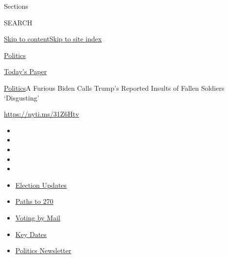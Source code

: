 Sections

SEARCH

\protect\hyperlink{site-content}{Skip to
content}\protect\hyperlink{site-index}{Skip to site index}

\href{https://www.nytimes3xbfgragh.onion/section/politics}{Politics}

\href{https://myaccount.nytimes3xbfgragh.onion/auth/login?response_type=cookie\&client_id=vi}{}

\href{https://www.nytimes3xbfgragh.onion/section/todayspaper}{Today's
Paper}

\href{/section/politics}{Politics}\textbar{}A Furious Biden Calls
Trump's Reported Insults of Fallen Soldiers `Disgusting'

\url{https://nyti.ms/31Z6Htv}

\begin{itemize}
\item
\item
\item
\item
\item
\end{itemize}

\begin{itemize}
\item
  \href{https://www.nytimes3xbfgragh.onion/live/2020/09/07/us/trump-vs-biden?action=click\&pgtype=Article\&state=default\&region=TOP_BANNER\&context=storylines_menu}{Election
  Updates}
\item
  \href{https://www.nytimes3xbfgragh.onion/interactive/2020/us/elections/election-states-biden-trump.html?action=click\&pgtype=Article\&state=default\&region=TOP_BANNER\&context=storylines_menu}{Paths
  to 270}
\item
  \href{https://www.nytimes3xbfgragh.onion/interactive/2020/08/31/us/politics/vote-by-mail-deadlines.html?action=click\&pgtype=Article\&state=default\&region=TOP_BANNER\&context=storylines_menu}{Voting
  by Mail}
\item
  \href{https://www.nytimes3xbfgragh.onion/interactive/2019/us/elections/2020-presidential-election-calendar.html?action=click\&pgtype=Article\&state=default\&region=TOP_BANNER\&context=storylines_menu}{Key
  Dates}
\item
  \href{https://www.nytimes3xbfgragh.onion/newsletters/politics?action=click\&pgtype=Article\&state=default\&region=TOP_BANNER\&context=storylines_menu}{Politics
  Newsletter}
\end{itemize}

